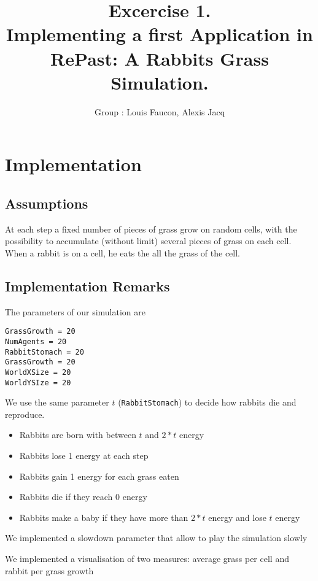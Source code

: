 \documentclass[11pt]{article}
\title{\bf Excercise 1.\\ Implementing a first Application in RePast: A Rabbits Grass Simulation.}
\author{Group \textnumero 10: Louis Faucon, Alexis Jacq}
\begin{document}
\maketitle

\section{Implementation}

\subsection{Assumptions}

At each step a fixed number of pieces of grass grow on random cells, with the possibility to accumulate (without limit) several pieces of grass on each cell. When a rabbit is on a cell, he eats the all the grass of the cell.

\subsection{Implementation Remarks}
The parameters of our simulation are 
\begin{verbatim}
GrassGrowth = 20
NumAgents = 20
RabbitStomach = 20
GrassGrowth = 20
WorldXSize = 20
WorldYSIze = 20
\end{verbatim}


We use the same parameter $t$ (\verb|RabbitStomach|) to decide how rabbits die and reproduce. 
\begin{itemize}
	\item Rabbits are born with between $t$ and $2*t$ energy
	\item Rabbits lose 1 energy at each step
	\item Rabbits gain 1 energy for each grass eaten
	\item Rabbits die if they reach 0 energy
	\item Rabbits make a baby if they have more than $2*t$ energy and lose $t$ energy
\end{itemize}

We implemented a slowdown parameter that allow to play the simulation slowly

We implemented a visualisation of two measures: average grass per cell and rabbit per grass growth
\end{document}
